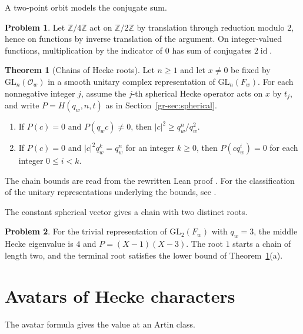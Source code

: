 \documentclass[reqno]{amsart}
\theoremstyle{definition}
\newtheorem{problem}{Problem}[section]
\newtheorem{theorem}{Theorem}[section]
\newcommand{\Z}{\mathbb Z}
\newcommand{\GL}{\mathrm{GL}}
\begin{document}
A two-point orbit models the conjugate sum.

\begin{problem}\label{pr:orbit}
Let \(\Z/4\Z\) act on \(\Z/2\Z\) by translation through reduction modulo \(2\), hence on functions by inverse translation of the argument.  On integer-valued functions, multiplication by the indicator of \(0\) has sum of conjugates \(2\operatorname{id}\).
\end{problem}

\begin{theorem}[Chains of Hecke roots]\label{thm:chain}
Let \(n\ge1\) and let \(x\ne0\) be fixed by \(\GL_n(\mathcal O_w)\)
in a smooth unitary complex representation of \(\GL_n(F_w)\).  For each nonnegative integer \(j\), assume the \(j\)-th spherical Hecke operator acts on \(x\) by \(t_j\), and write \(P=H(q_w,n,t)\) as in Section~\ref{gr-sec:spherical}.
\begin{enumerate}
\item[(a)] If \(P(c)=0\) and \(P(q_wc)\ne0\), then \(|c|^2\ge q_w^n/q_w^2\).
\item[(b)] If \(P(c)=0\) and \(|c|^2q_w^k=q_w^n\) for an integer \(k\ge0\), then \(P(cq_w^i)=0\) for each integer \(0\le i<k\).
\end{enumerate}
\end{theorem}
The chain bounds are read from the rewritten Lean proof \cite{GL}.  For the classification of the unitary representations underlying the bounds, see \cite{Tad}.

The constant spherical vector gives a chain with two distinct roots.

\begin{problem}\label{pr:chain}
For the trivial representation of \(\GL_2(F_w)\) with \(q_w=3\), the middle Hecke eigenvalue is \(4\) and \(P=(X-1)(X-3)\).  The root \(1\) starts a chain of length two, and the terminal root satisfies the lower bound of Theorem~\ref{thm:chain}(a).
\end{problem}

\section{Avatars of Hecke characters}\label{sec:avatars}

The avatar formula gives the value at an Artin class.
\end{document}
